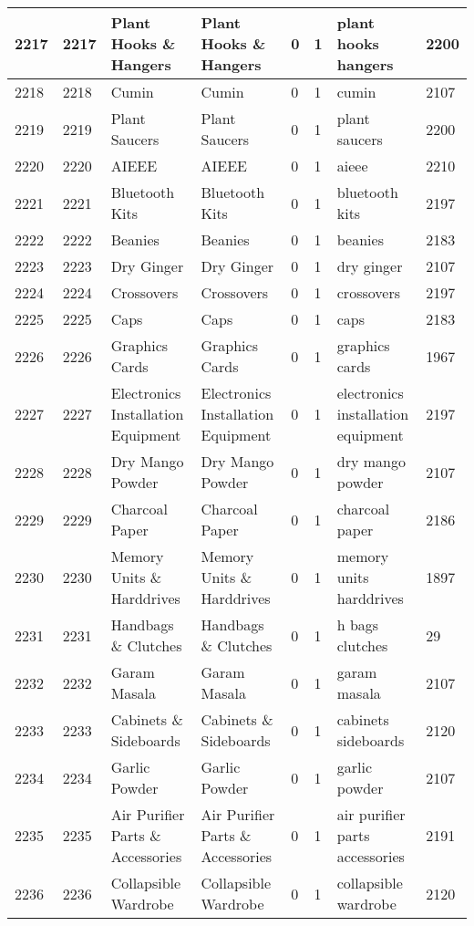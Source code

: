 \begin{longtable}{|l|l|l|l|l|l|l|l|}
2217 & 2217 & Plant Hooks \& Hangers & Plant Hooks \& Hangers & 0 & 1 & plant hooks hangers & 2200 \\ \hline 
2218 & 2218 & Cumin & Cumin & 0 & 1 & cumin & 2107 \\ \hline 
2219 & 2219 & Plant Saucers & Plant Saucers & 0 & 1 & plant saucers & 2200 \\ \hline 
2220 & 2220 & AIEEE & AIEEE & 0 & 1 & aieee & 2210 \\ \hline 
2221 & 2221 & Bluetooth Kits & Bluetooth Kits & 0 & 1 & bluetooth kits & 2197 \\ \hline 
2222 & 2222 & Beanies & Beanies & 0 & 1 & beanies & 2183 \\ \hline 
2223 & 2223 & Dry Ginger & Dry Ginger & 0 & 1 & dry ginger & 2107 \\ \hline 
2224 & 2224 & Crossovers & Crossovers & 0 & 1 & crossovers & 2197 \\ \hline 
2225 & 2225 & Caps & Caps & 0 & 1 & caps & 2183 \\ \hline 
2226 & 2226 & Graphics Cards & Graphics Cards & 0 & 1 & graphics cards & 1967 \\ \hline 
2227 & 2227 & Electronics Installation Equipment & Electronics Installation Equipment & 0 & 1 & electronics installation equipment & 2197 \\ \hline 
2228 & 2228 & Dry Mango Powder & Dry Mango Powder & 0 & 1 & dry mango powder & 2107 \\ \hline 
2229 & 2229 & Charcoal Paper & Charcoal Paper & 0 & 1 & charcoal paper & 2186 \\ \hline 
2230 & 2230 & Memory Units \& Harddrives & Memory Units \& Harddrives & 0 & 1 & memory units harddrives & 1897 \\ \hline 
2231 & 2231 & Handbags \& Clutches & Handbags \& Clutches & 0 & 1 & h bags clutches & 29 \\ \hline 
2232 & 2232 & Garam Masala & Garam Masala & 0 & 1 & garam masala & 2107 \\ \hline 
2233 & 2233 & Cabinets \& Sideboards & Cabinets \& Sideboards & 0 & 1 & cabinets sideboards & 2120 \\ \hline 
2234 & 2234 & Garlic Powder & Garlic Powder & 0 & 1 & garlic powder & 2107 \\ \hline 
2235 & 2235 & Air Purifier Parts \& Accessories & Air Purifier Parts \& Accessories & 0 & 1 & air purifier parts accessories & 2191 \\ \hline 
2236 & 2236 & Collapsible Wardrobe & Collapsible Wardrobe & 0 & 1 & collapsible wardrobe & 2120 \\ \hline 

\end{longtable}
